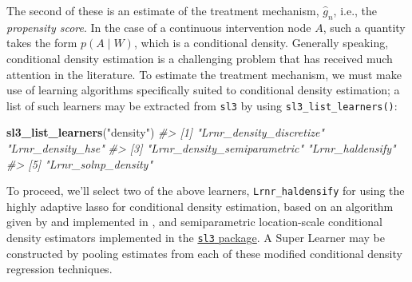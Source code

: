 \documentclass[12pt, krantz2,]{book}
\newenvironment{Shaded}{\begin{snugshade}}{\end{snugshade}}
\newcommand{\CommentTok}[1]{\textcolor[rgb]{0.56,0.35,0.01}{\textit{#1}}}
\newcommand{\DataTypeTok}[1]{\textcolor[rgb]{0.13,0.29,0.53}{#1}}
\newcommand{\DecValTok}[1]{\textcolor[rgb]{0.00,0.00,0.81}{#1}}
\newcommand{\KeywordTok}[1]{\textcolor[rgb]{0.13,0.29,0.53}{\textbf{#1}}}
\newcommand{\NormalTok}[1]{#1}
\newcommand{\OperatorTok}[1]{\textcolor[rgb]{0.81,0.36,0.00}{\textbf{#1}}}
\newcommand{\StringTok}[1]{\textcolor[rgb]{0.31,0.60,0.02}{#1}}
\theoremstyle{definition}
\theoremstyle{definition}
\theoremstyle{definition}
\newcommand{\1}{\mathbbm{1}}
\begin{document}
\begin{Shaded}
\end{Shaded}

The second of these is an estimate of the treatment mechanism, \(\hat{g}_n\),
i.e., the \emph{propensity score}. In the case of a continuous intervention node \(A\),
such a quantity takes the form \(p(A \mid W)\), which is a conditional density.
Generally speaking, conditional density estimation is a challenging problem that
has received much attention in the literature. To estimate the treatment
mechanism, we must make use of learning algorithms specifically suited to
conditional density estimation; a list of such learners may be extracted from
\texttt{sl3} by using \texttt{sl3\_list\_learners()}:

\begin{Shaded}
\begin{Highlighting}[]
\KeywordTok{sl3_list_learners}\NormalTok{(}\StringTok{"density"}\NormalTok{)}
\CommentTok{#> [1] "Lrnr_density_discretize"     "Lrnr_density_hse"           }
\CommentTok{#> [3] "Lrnr_density_semiparametric" "Lrnr_haldensify"            }
\CommentTok{#> [5] "Lrnr_solnp_density"}
\end{Highlighting}
\end{Shaded}

To proceed, we'll select two of the above learners, \texttt{Lrnr\_haldensify} for using
the highly adaptive lasso for conditional density estimation, based on an
algorithm given by \citet{diaz2011super} and implemented in \citet{hejazi2020haldensify}, and
semiparametric location-scale conditional density estimators implemented in the
\href{https://github.com/tlverse/sl3}{\texttt{sl3} package}. A Super Learner may be
constructed by pooling estimates from each of these modified conditional density
regression techniques.
\end{document}

